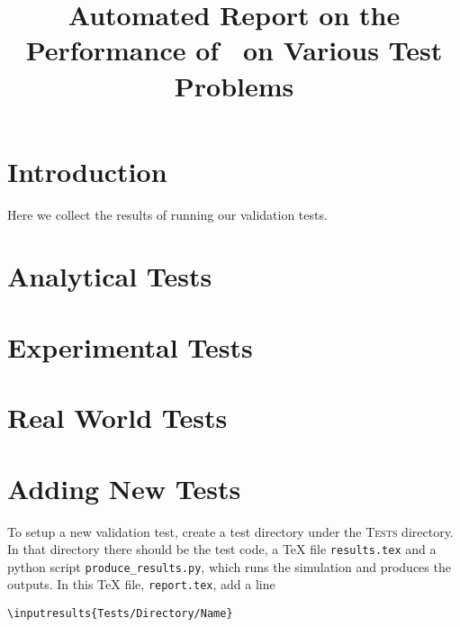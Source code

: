 \documentclass[11pt,a4paper]{report}
\begin{document}
 
\title{Automated Report on the Performance of \anuga ~on Various Test Problems}
\maketitle
\tableofcontents
\chapter{Introduction}

Here we collect the results of running our validation tests. 



\chapter{Analytical Tests}








\chapter{Experimental Tests}


\chapter{Real World Tests}


\appendix
\chapter{Adding New Tests}


To setup a new validation test, create a test directory under the
\textsc{Tests} directory. In that directory there should be the test code, a
\TeX{} file \texttt{results.tex} and a python script
\texttt{produce\_results.py}, which runs the simulation and produces the
outputs. In this \TeX{} file, \texttt{report.tex}, add a line
\begin{verbatim}
\inputresults{Tests/Directory/Name}
\end{verbatim}
\end{document}
